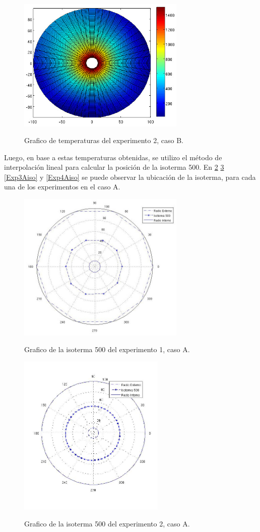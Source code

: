 \documentclass[12pt,a4paper]{article}
\begin{document}
\begin{figure}[h!]
\centering
\caption{Grafico de temperaturas del experimento 2, caso B.}
\includegraphics[width=8cm]{test5050btemp.jpg}
\label{Exp2Btemp}
\end{figure}

Luego, en base a estas temperaturas obtenidas, se utilizo el método de interpolación lineal para calcular la posición de la isoterma 500. En \ref{Exp1Aiso} \ref{Exp2Aiso} \ref{Exp3Aiso} y \ref{Exp4Aiso} se puede observar la ubicación de la isoterma, para cada una de los experimentos en el caso A. 

\begin{figure}[h!]
\centering
\caption{Grafico de la isoterma 500 del experimento 1, caso A.}
\includegraphics[width=8cm]{test1010aiso.jpg}
\label{Exp1Aiso}
\end{figure}

\begin{figure}[h!]
\centering
\caption{Grafico de la isoterma 500 del experimento 2, caso A.}
\includegraphics[width=7cm]{test5050aiso.jpg}
\label{Exp2Aiso}
\end{figure}
\end{document}
